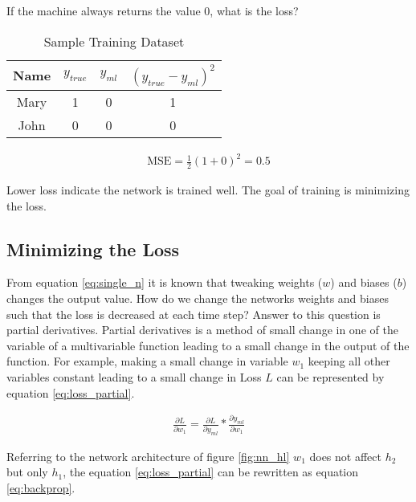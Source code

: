If the machine always returns the value 0, what is the loss?

\begin{table}[h]
    \centering
    \caption{Sample Training Dataset}
    \label{table:Sample Training Dataset}
    \begin{tabular}{ cccc }
          \toprule
          
          \textbf{Name}& \textbf{$y_ {true}$} & \textbf{$y_ {ml}$}  & \textbf{$(y_ {true} - y_{ml})^2$}\\
          \midrule
          Mary&1 & 0 & 1\\
          John&0 & 0 & 0\\         
         
          \bottomrule
          \end{tabular}
\end{table}

\begin{align}
    \text{MSE} = \frac{1}{2} (1+0)^2 = 0.5
\end{align}

Lower loss indicate the network is trained well. The goal of training is minimizing the loss. 


\subsection*{Minimizing the Loss}

From equation \ref{eq:single_n} it is known that tweaking weights ($w$) and biases ($b$) changes the output value.  How do we change the networks weights and biases such that the loss is decreased at each time step? Answer to this question is partial derivatives. Partial derivatives is a method of small change in one of the variable of a multivariable function leading to a small change in the output of the function. For example, making a small change in variable $w_1$ keeping all other variables constant leading to a small change in Loss $L$ can be represented by equation \ref{eq:loss_partial}.

\begin{align}
    \frac{\partial L }{\partial w_1} = \frac{\partial L}{\partial y_{ml}} * \frac{\partial y_{ml}}{\partial w_1}
    \label{eq:loss_partial}
\end{align}

Referring to the network architecture of figure \ref{fig:nn_hl} $w_1$ does not affect $h_2$ but only $h_1$, the equation \ref{eq:loss_partial} can be rewritten as equation \ref{eq:backprop}.

